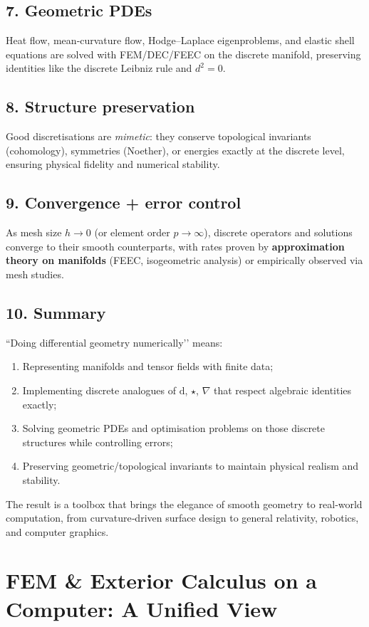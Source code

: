 \documentclass[12pt]{article}
\theoremstyle{definition} %
\theoremstyle{plain} %
\begin{document}
\subsection*{7.  Geometric PDEs}
Heat flow, mean‑curvature flow, Hodge–Laplace eigenproblems, and elastic
shell equations are solved with FEM/DEC/FEEC on the discrete manifold,
preserving identities like the discrete Leibniz rule and $d^2\!=\!0$.

\subsection*{8.  Structure preservation}
Good discretisations are \emph{mimetic}: they conserve topological
invariants (cohomology), symmetries (Noether), or energies exactly at
the discrete level, ensuring physical fidelity and numerical stability.

\subsection*{9.  Convergence + error control}
As mesh size $h\!\to\!0$ (or element order $p\!\to\!\infty$),
discrete operators and solutions converge to their smooth counterparts,
with rates proven by \textbf{approximation theory on manifolds}
(FEEC, isogeometric analysis) or empirically observed via mesh studies.

\subsection*{10.  Summary}
“Doing differential geometry numerically’’ means:
\begin{enumerate}
  \item Representing manifolds and tensor fields with finite data;
  \item Implementing discrete analogues of $\mathrm{d}$, $\star$, $\nabla$ that
        respect algebraic identities exactly;
  \item Solving geometric PDEs and optimisation problems on those
        discrete structures while controlling errors;
  \item Preserving geometric/topological invariants to maintain physical
        realism and stability.
\end{enumerate}
The result is a toolbox that brings the elegance of smooth geometry to
real‑world computation, from curvature‑driven surface design to general
relativity, robotics, and computer graphics.

\section*{FEM \& Exterior Calculus on a Computer:  A Unified View}
\end{document}

